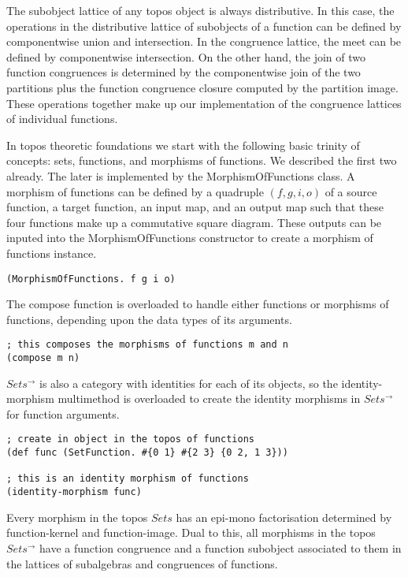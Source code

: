 \documentclass[a4paper,11pt]{report}
\begin{document}
The subobject lattice of any topos object is always distributive. In this case, the operations in the distributive lattice of subobjects of a function can be defined by componentwise union and intersection. In the congruence lattice, the meet can be defined by componentwise intersection. On the other hand, the join of two function congruences is determined by the componentwise join of the two partitions plus the function congruence closure computed by the partition image. These operations together make up our implementation of the congruence lattices of individual functions.

\newpage 

In topos theoretic foundations we start with the following basic trinity of concepts: sets, functions, and morphisms of functions. We described the first two already. The later is implemented by the MorphismOfFunctions class. A morphism of functions can be defined by a quadruple $(f,g,i,o)$ of a source function, a target function, an input map, and an output map such that these four functions make up a commutative square diagram. These outputs can be inputed into the MorphismOfFunctions constructor to create a morphism of functions instance.

\lstset {language=Lisp}
\begin{lstlisting}
(MorphismOfFunctions. f g i o)
\end{lstlisting}

The compose function is overloaded to handle either functions or morphisms of functions, depending upon the data types of its arguments.

\lstset {language=Lisp}
\begin{lstlisting}
; this composes the morphisms of functions m and n
(compose m n) 
\end{lstlisting}

$Sets^{\to}$ is also a category with identities for each of its objects, so the identity-morphism multimethod is overloaded to create the identity morphisms in $Sets^{\to}$ for function arguments.

\lstset {language=Lisp}
\begin{lstlisting}
; create in object in the topos of functions
(def func (SetFunction. #{0 1} #{2 3} {0 2, 1 3}))

; this is an identity morphism of functions
(identity-morphism func)
\end{lstlisting}

Every morphism in the topos $Sets$ has an epi-mono factorisation determined by function-kernel and function-image. Dual to this, all morphisms in the topos $Sets^{\to}$ have a function congruence and a function subobject associated to them in the lattices of subalgebras and congruences of functions.
\end{document}
